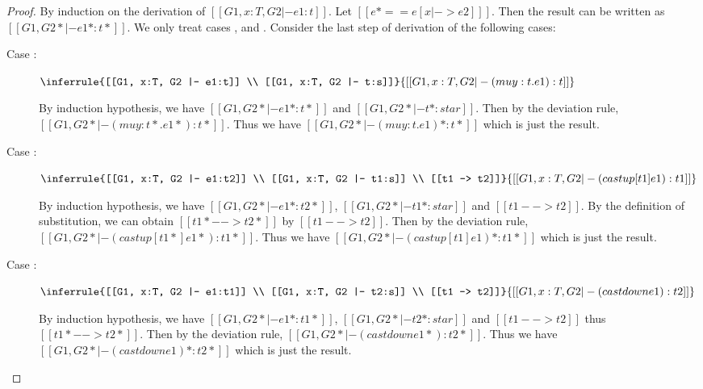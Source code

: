 \begin{proof}
    By induction on the derivation of $[[G1, x:T, G2 |- e1:t]]$. Let $[[e* == e [x |-> e2] ]]$. Then the result can be written as $[[G1, G2* |- e1*  : t* ]]$. We only treat cases ,  and . Consider the last step of derivation of the following cases:
    \begin{description}
        \item[Case :] $\inferrule{[[G1, x:T, G2 |- e1:t]] \\ [[G1, x:T, G2 |- t:s]]}{[[G1, x:T, G2 |- (mu y:t.e1): t]]}$ 
        
        By induction hypothesis, we have $[[G1, G2* |- e1* : t*]]$ and $[[G1, G2* |- t* : star]]$. Then by the deviation rule, $[[G1, G2* |- (mu y:t*.e1*):t*]]$. Thus we have $[[G1, G2* |- (mu y:t.e1)*:t*]]$ which is just the result.
        \item[Case :] $\inferrule{[[G1, x:T, G2 |- e1:t2]] \\ [[G1, x:T, G2 |- t1:s]] \\ [[t1 --> t2]]}{[[G1, x:T, G2 |- (castup [t1] e1):t1]]}$ 
        
        By induction hypothesis, we have $[[G1, G2* |- e1*:t2*]]$, $[[G1, G2* |- t1*:star]]$ and $[[t1 --> t2]]$. By the definition of substitution, we can obtain $[[t1* --> t2*]]$ by $[[t1 --> t2]]$. Then by the deviation rule, $[[G1, G2* |- (castup [t1*] e1*):t1*]]$. Thus we have $[[G1, G2* |- (castup [t1] e1)*:t1*]]$ which is just the result.
        \item[Case :] $\inferrule{[[G1, x:T, G2 |- e1:t1]] \\ [[G1, x:T, G2 |- t2:s]] \\ [[t1 --> t2]]}{[[G1, x:T, G2 |- (castdown e1):t2]]}$ 
        
        By induction hypothesis, we have $[[G1, G2* |- e1*:t1*]]$, $[[G1, G2* |- t2*:star]]$ and $[[t1 --> t2]]$ thus $[[t1* --> t2*]]$. Then by the deviation rule, $[[G1, G2* |- (castdown e1*):t2*]]$. Thus we have $[[G1, G2* |- (castdown e1)*:t2*]]$ which is just the result.
    \end{description}
\end{proof}


